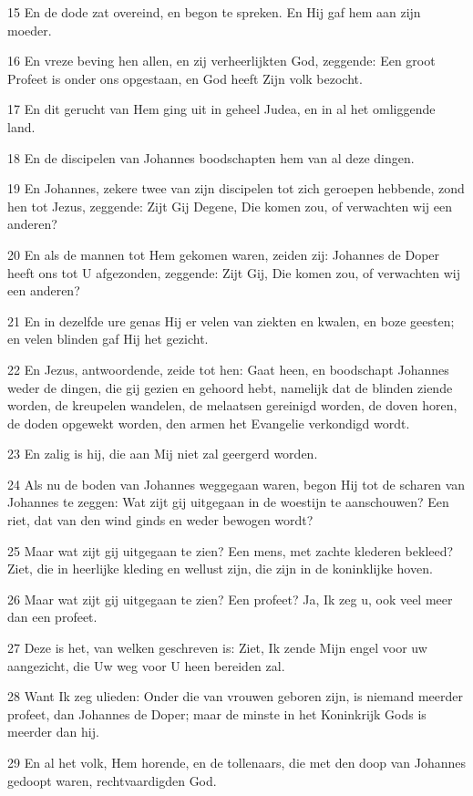 \par 15 En de dode zat overeind, en begon te spreken. En Hij gaf hem aan zijn moeder.
\par 16 En vreze beving hen allen, en zij verheerlijkten God, zeggende: Een groot Profeet is onder ons opgestaan, en God heeft Zijn volk bezocht.
\par 17 En dit gerucht van Hem ging uit in geheel Judea, en in al het omliggende land.
\par 18 En de discipelen van Johannes boodschapten hem van al deze dingen.
\par 19 En Johannes, zekere twee van zijn discipelen tot zich geroepen hebbende, zond hen tot Jezus, zeggende: Zijt Gij Degene, Die komen zou, of verwachten wij een anderen?
\par 20 En als de mannen tot Hem gekomen waren, zeiden zij: Johannes de Doper heeft ons tot U afgezonden, zeggende: Zijt Gij, Die komen zou, of verwachten wij een anderen?
\par 21 En in dezelfde ure genas Hij er velen van ziekten en kwalen, en boze geesten; en velen blinden gaf Hij het gezicht.
\par 22 En Jezus, antwoordende, zeide tot hen: Gaat heen, en boodschapt Johannes weder de dingen, die gij gezien en gehoord hebt, namelijk dat de blinden ziende worden, de kreupelen wandelen, de melaatsen gereinigd worden, de doven horen, de doden opgewekt worden, den armen het Evangelie verkondigd wordt.
\par 23 En zalig is hij, die aan Mij niet zal geergerd worden.
\par 24 Als nu de boden van Johannes weggegaan waren, begon Hij tot de scharen van Johannes te zeggen: Wat zijt gij uitgegaan in de woestijn te aanschouwen? Een riet, dat van den wind ginds en weder bewogen wordt?
\par 25 Maar wat zijt gij uitgegaan te zien? Een mens, met zachte klederen bekleed? Ziet, die in heerlijke kleding en wellust zijn, die zijn in de koninklijke hoven.
\par 26 Maar wat zijt gij uitgegaan te zien? Een profeet? Ja, Ik zeg u, ook veel meer dan een profeet.
\par 27 Deze is het, van welken geschreven is: Ziet, Ik zende Mijn engel voor uw aangezicht, die Uw weg voor U heen bereiden zal.
\par 28 Want Ik zeg ulieden: Onder die van vrouwen geboren zijn, is niemand meerder profeet, dan Johannes de Doper; maar de minste in het Koninkrijk Gods is meerder dan hij.
\par 29 En al het volk, Hem horende, en de tollenaars, die met den doop van Johannes gedoopt waren, rechtvaardigden God.
